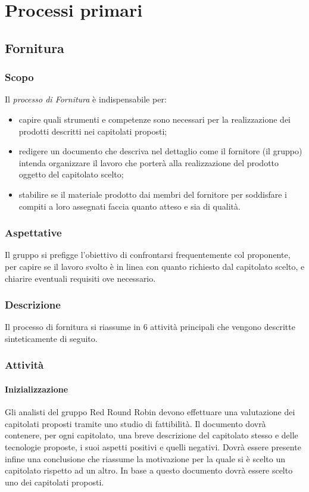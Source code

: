 \section{Processi primari} 


\subsection{Fornitura}

	\subsubsection{Scopo}
	\text Il \textit{processo di Fornitura} è indispensabile per:
	\begin{itemize}
	\item capire quali strumenti e competenze sono necessari per la realizzazione dei prodotti descritti nei capitolati proposti;
	\item redigere un documento che descriva nel dettaglio come il fornitore (il gruppo) intenda organizzare il lavoro che porterà alla realizzazione del prodotto oggetto del capitolato scelto;
	\item stabilire se il materiale prodotto dai membri del fornitore per soddisfare i compiti a loro assegnati faccia quanto atteso e sia di qualità.    
	\end{itemize}
 	\subsubsection{Aspettative}
	Il gruppo si prefigge l'obiettivo di confrontarsi frequentemente col proponente, per capire se il lavoro svolto è in linea con quanto richiesto dal capitolato scelto, e chiarire eventuali requisiti ove necessario.
	\subsubsection{Descrizione}
	Il processo di fornitura si riassume in 6 attività principali che vengono descritte sinteticamente di seguito. 
	\subsubsection{Attività}
		
		\paragraph{Inizializzazione}
			Gli analisti del gruppo Red Round Robin devono effettuare una valutazione dei capitolati proposti tramite uno studio di fattibilità. 
			 Il documento dovrà contenere, per ogni capitolato, una breve descrizione del capitolato stesso e delle tecnologie proposte, i suoi aspetti positivi e quelli negativi. Dovrà essere presente infine una conclusione che riassume la motivazione per la quale si è scelto un capitolato rispetto ad un altro. 
			In base a questo documento dovrà essere scelto uno dei capitolati proposti.
